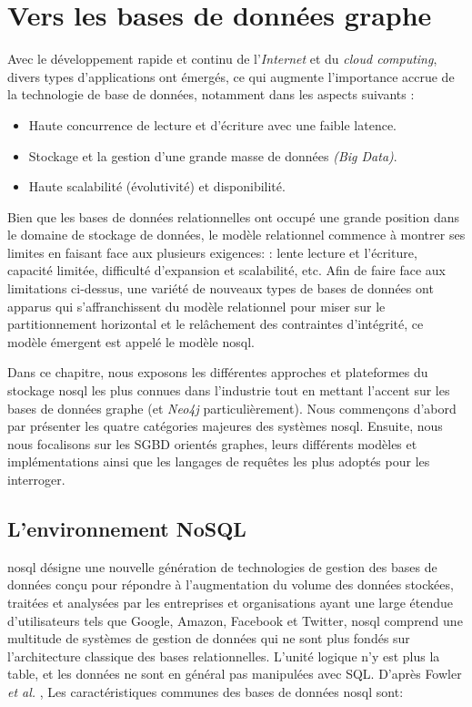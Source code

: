 \chapter{Vers les bases de données graphe}
\label{annexe:graph-db}

Avec le développement rapide et continu de l'\textit{Internet} et du
\textit{cloud computing}, divers types d'applications ont émergés, ce
qui augmente l'importance accrue de la technologie de base de données,
notamment dans les aspects suivants \cite{han2011survey}:

\begin{itemize}\renewcommand\labelitemi{--}
\item Haute concurrence de lecture et d'écriture avec une faible
  latence.

\item Stockage et la gestion d'une grande masse de données \emph{(Big
    Data)}.

\item Haute scalabilité (évolutivité) et disponibilité.\medskip
\end{itemize}
\enddescription

Bien que les bases de données relationnelles ont occupé une grande
position dans le domaine de stockage de données, le modèle relationnel
commence à montrer ses limites en faisant face aux plusieurs
exigences: \cite{han2011survey}: lente lecture et l'écriture, capacité
limitée, difficulté d'expansion et scalabilité, etc. Afin de faire
face aux limitations ci-dessus, une variété de nouveaux types de bases
de données ont apparus qui s'affranchissent du modèle relationnel
pour miser sur le partitionnement horizontal et le relâchement des
contraintes d'intégrité, ce modèle émergent est appelé le modèle
\acrshort{nosql}.\medskip

Dans ce chapitre, nous exposons les différentes approches et
plateformes du stockage \acrshort{nosql} les plus connues dans
l'industrie tout en mettant l'accent sur les bases de données graphe
(et \emph{Neo4j} particulièrement). Nous commençons d'abord par
présenter les quatre catégories majeures des systèmes
\acrshort{nosql}. Ensuite, nous nous focalisons sur les \acrshort{SGBD}
orientés graphes, leurs différents modèles et implémentations ainsi
que les langages de requêtes les plus adoptés pour les interroger.

\section{L'environnement NoSQL}
\label{sec:nosql}
\acrshort{nosql} désigne une nouvelle génération de technologies de
gestion des bases de données conçu pour répondre à l'augmentation du
volume des données stockées, traitées et analysées par les entreprises
et organisations ayant une large étendue d'utilisateurs tels que
Google, Amazon, Facebook et Twitter, \acrshort{nosql} comprend une
multitude de systèmes de gestion de données qui ne sont plus fondés
sur l'architecture classique des bases relationnelles. L'unité logique
n'y est plus la table, et les données ne sont en général pas
manipulées avec \textsc{SQL}.  D'après Fowler \textit{et al.}
\cite{sadalage2012nosql}, Les caractéristiques communes des bases de
données \acrshort{nosql} sont:

